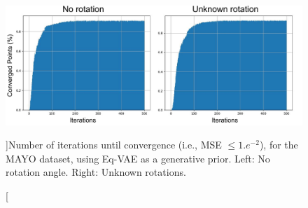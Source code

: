 \begin{figure}[ht!]
    \includegraphics[width=\textwidth]{pics/2_equiv_vae/eqvae_iters_conv.pdf}\hfill
    \caption[][\baselineskip]{Number of iterations until convergence (i.e., MSE $\leq 1.e^{-2}$), for the MAYO dataset, using Eq-VAE as a generative prior. Left: No rotation angle. Right: Unknown rotations.}
    \label{fig:mayo_cdf_mse_conv}
    \vspace*{\baselineskip}
\end{figure}